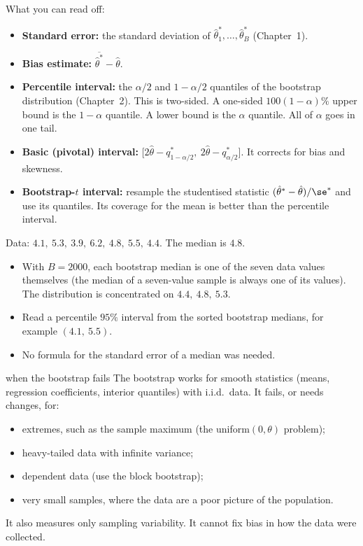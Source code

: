 What you can read off:
\begin{itemize}
  \item \textbf{Standard error:} the standard deviation of $\hat\theta^*_1,\dots,\hat\theta^*_B$ (Chapter~1).
  \item \textbf{Bias estimate:} $\overline{\hat\theta^*}-\hat\theta$.
  \item \textbf{Percentile interval:} the $\alpha/2$ and $1-\alpha/2$ quantiles of the bootstrap distribution (Chapter~2). This is two-sided. A one-sided $100(1-\alpha)\%$ upper bound is the $1-\alpha$ quantile. A lower bound is the $\alpha$ quantile. All of $\alpha$ goes in one tail.
  \item \textbf{Basic (pivotal) interval:} $\big[2\hat\theta-q^*_{1-\alpha/2},\ 2\hat\theta-q^*_{\alpha/2}\big]$. It corrects for bias and skewness.
  \item \textbf{Bootstrap-$t$ interval:} resample the studentised statistic $(\hat\theta^*-\hat\theta)/\se^*$ and use its quantiles. Its coverage for the mean is better than the percentile interval.
\end{itemize}

\begin{example}
Data: $4.1,\ 5.3,\ 3.9,\ 6.2,\ 4.8,\ 5.5,\ 4.4$. The median is $4.8$.
\begin{itemize}
  \item With $B=2000$, each bootstrap median is one of the seven data values themselves (the median of a seven-value sample is always one of its values). The distribution is concentrated on $4.4,\ 4.8,\ 5.3$.
  \item Read a percentile $95\%$ interval from the sorted bootstrap medians, for example $(4.1,\ 5.5)$.
  \item No formula for the standard error of a median was needed.
\end{itemize}
\end{example}

\begin{nuance}{when the bootstrap fails}
The bootstrap works for smooth statistics (means, regression coefficients, interior quantiles) with i.i.d.\ data. It fails, or needs changes, for:
\begin{itemize}
  \item extremes, such as the sample maximum (the uniform$(0,\theta)$ problem);
  \item heavy-tailed data with infinite variance;
  \item dependent data (use the block bootstrap);
  \item very small samples, where the data are a poor picture of the population.
\end{itemize}
It also measures only sampling variability. It cannot fix bias in how the data were collected.
\end{nuance}

